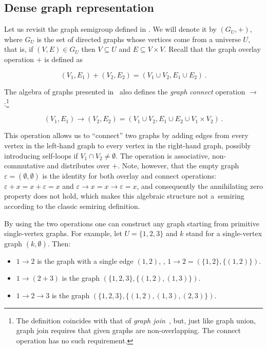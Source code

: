 \documentclass{toc}
\begin{document}
\subsection{Dense graph representation}\label{sec-dense-graph}

Let us revisit the graph semigroup defined in .
We will denote it by $(G_U, +)$, where $G_U$ is the set of directed graphs whose
vertices come from a universe $U$, that is, if $(V, E) \in G_U$ then
$V \subseteq U$ and $E \subseteq V \times V$. Recall that the graph overlay
operation $+$ is defined as

\[
(V_1, E_1) + (V_2, E_2) = (V_1 \cup V_2, E_1 \cup E_2)\,.
\]

\noindent
The algebra of graphs presented in~\cite{mokhov2017algebraic} also defines
the \emph{graph connect} operation $\rightarrow$:\footnote{The definition
    coincides with that of \emph{graph join}~\cite{1969_graph_theory_harary}, but,
    just like graph union, graph join requires that given graphs are
    non-overlapping. The connect operation has no such requirement.}

\[
(V_1, E_1) \rightarrow (V_2, E_2) = (V_1 \cup V_2, E_1 \cup E_2 \cup V_1 \times V_2)\,.
\]

This operation allows us to ``connect'' two graphs by adding edges from every
vertex in the left-hand graph to every vertex in the right-hand graph, possibly
introducing self-loops if $V_1 \cap V_2 \neq \emptyset$. The operation is
associative, non-commutative and distributes over $+$. Note, however, that the
empty graph $\varepsilon = (\emptyset, \emptyset)$ is the identity for both
overlay and connect operations: $\varepsilon + x = x + \varepsilon = x$ and
$\varepsilon \rightarrow x = x \rightarrow \varepsilon = x$, and consequently
the annihilating zero property does not hold, which makes this algebraic
structure not a~semiring according to the classic semiring definition.

By using the two operations one can construct any graph starting from primitive
single-vertex graphs. For example, let $U=\{1,2,3\}$ and $k$ stand for a
single-vertex graph $({k}, \emptyset)$. Then:

\begin{itemize}
    \item $1 \rightarrow 2$ is the graph with a single edge $(1,2)$, \ie,
    $1 \rightarrow 2 = (\{1,2\}, \{(1,2)\})$.
    \item $1 \rightarrow (2 + 3)$ is the graph $(\{1,2,3\}, \{(1,2),(1,3)\})$.
    \item $1 \rightarrow 2 \rightarrow 3$ is the graph $(\{1,2,3\}, \{(1,2),(1,3),(2,3)\})$.
\end{itemize}
\end{document}

